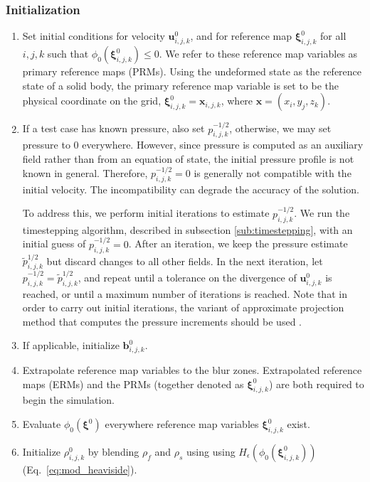 \documentclass[times, 10pt]{article}
\renewcommand{\vec}[1]{\mathbf{#1}}
\newcommand{\vu}{\vec{u}}
\newcommand{\vx}{\vec{x}}
\newcommand{\vxi}{\boldsymbol\xi}
\begin{document}
\subsubsection*{Initialization}
\begin{enumerate}
    \item Set initial conditions for velocity $\vu_{i,j,k}^0$, and for reference map $\vxi_{i,j,k}^0$ for all $i, j, k$ such that $\phi_0(\vxi_{i,j,k}^0) \le 0$.
    We refer to these reference map variables as primary reference maps (PRMs).
    Using the undeformed state as the reference state of a solid body, the primary reference map variable is set to be the physical coordinate on the grid, $\vxi_{i,j,k}^0 = \vx_{i,j,k}$, where $\vx=(x_i, y_j, z_k)$.

    \item If a test case has known pressure, also set $p_{i,j,k}^{-1/2}$, otherwise, we may set pressure to 0 everywhere.
    However, since pressure is computed as an auxiliary field rather than from an equation of state, the initial pressure profile is not known in general.
    Therefore, $p_{i,j,k}^{-1/2}=0$ is generally not compatible with the initial velocity.
    The incompatibility can degrade the accuracy of the solution.

    \qquad To address this, we perform initial iterations to estimate $p_{i,j,k}^{-1/2}$. We run the timestepping algorithm, described in subsection \ref{sub:timestepping}, with an initial guess of $p_{i,j,k}^{-1/2}=0$.
    After an iteration, we keep the pressure estimate $\tilde p_{i,j,k}^{1/2}$ but discard changes to all other fields.
    In the next iteration, let $p_{i,j,k}^{-1/2} = \tilde p_{i,j,k}^{1/2}$, and repeat until a tolerance on the divergence of $\vu_{i,j,k}^0$ is reached, or until a maximum number of iterations is reached.
    Note that in order to carry out initial iterations, the variant of approximate projection method that computes the pressure increments should be used \cite{almgren00}.

    \item If applicable, initialize $\mathbf b_{i,j,k}^0$.
    \item Extrapolate reference map variables to the blur zones.
    Extrapolated reference maps (ERMs) and the PRMs (together denoted as  $\vxi_{i,j,k}^0$) are both required to begin the simulation.
    \item Evaluate $\phi_0(\vxi^0)$ everywhere reference map variables  $\vxi_{i,j,k}^0$ exist.
    \item Initialize $\rho_{i,j,k}^0$ by blending $\rho_f$ and $\rho_s$ using using $H_\epsilon(\phi_0(  \vxi_{i,j,k}^0 ))$ (Eq.~\eqref{eq:mod_heaviside}).
\end{enumerate}
\end{document}
